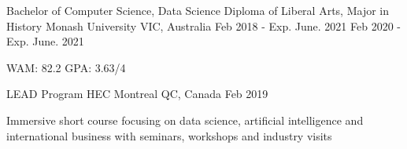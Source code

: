 

\begin{cventries}

  \cventry
    {Bachelor of Computer Science, Data Science \linebreak Diploma of Liberal Arts, Major in History} %
    {Monash University} %
    {VIC, Australia} %
    {Feb 2018 - Exp. June. 2021 \linebreak Feb 2020 - Exp. June. 2021} %
    {
      \begin{cvitems} %
        \item {WAM: 82.2 GPA: 3.63/4}
      \end{cvitems}
    }

  \cventry
    {LEAD Program} %
    {HEC Montreal} %
    {QC, Canada} %
    {Feb 2019} %
    {
      \begin{cvitems} %
        \item {Immersive short course focusing on data science, artificial intelligence and international business with seminars, workshops and industry visits}
      \end{cvitems}
    }

\end{cventries}
